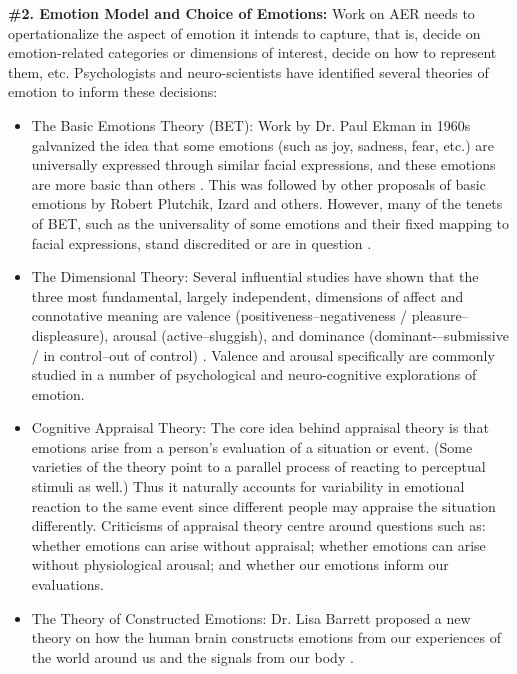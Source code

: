 \documentclass{clv3}
\begin{document}
\noindent \textbf{\#2. Emotion Model and Choice of Emotions:} %
\noindent Work on AER needs to opertationalize the aspect of emotion it intends to capture, that is, decide on emotion-related categories or dimensions of interest, decide on how to represent them, etc.
Psychologists and neuro-scientists have identified several theories of emotion to inform these decisions:\\[-18pt]
\begin{itemize}
    \item The Basic Emotions Theory (BET): Work by Dr. Paul Ekman in 1960s galvanized the idea that some emotions (such as joy, sadness, fear, etc.) are universally expressed through similar facial expressions, and these emotions are more basic than others \cite{ekman1992there,ekman1994nature}. This was followed by other proposals of basic emotions by Robert Plutchik, Izard and others. However, many of the tenets of BET, such as the universality of some emotions and their fixed mapping to facial expressions, stand discredited or are in question \cite{barrett2017emotions,barrett2019emotional}.
\item The Dimensional Theory: Several influential studies have shown that the three most fundamental, largely independent, dimensions of affect and connotative meaning are valence (positiveness--negativeness / pleasure--displeasure), arousal (active--sluggish), and dominance (dominant-–submissive / in control--out of control) \cite{osgood1957measurement,russell1980circumplex,russell1977evidence,russell2003core}. Valence and arousal specifically are commonly studied in a number of psychological and neuro-cognitive explorations of emotion.
\item Cognitive Appraisal Theory: The core idea behind appraisal theory \cite{scherer1999appraisal,lazarus1991progress} is that emotions arise from a person’s evaluation of a situation or event. (Some varieties of the theory point to a parallel process of reacting to perceptual stimuli as well.) Thus it naturally accounts for variability in emotional reaction to the same event since different people may appraise the situation differently. Criticisms of appraisal theory centre around questions such as: whether emotions can arise without appraisal; whether emotions can arise without physiological arousal; and whether our emotions inform our evaluations.
\item The Theory of Constructed Emotions: Dr. Lisa Barrett proposed a new theory on how the human brain constructs emotions from our experiences of the world around us and the signals from our body \cite{barrett2017theory}.
\end{itemize}
\end{document}
